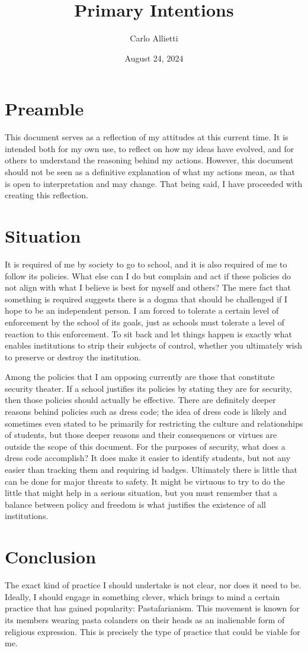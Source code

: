 \documentclass{article}
\title{Primary Intentions}
\author{Carlo Allietti}
\date{August 24, 2024}
\begin{document}
\maketitle
\section{Preamble}
This document serves as a reflection of my attitudes at this current time. It is intended both for my own use, to reflect on how my ideas have evolved, and for others to understand the reasoning behind my actions. However, this document should not be seen as a definitive explanation of what my actions mean, as that is open to interpretation and may change. That being said, I have proceeded with creating this reflection.

\section{Situation}
It is required of me by society to go to school, and it is also required of me to follow its policies. What else can I do but complain and act if these policies do not align with what I believe is best for myself and others? The mere fact that something is required suggests there is a dogma that should be challenged if I hope to be an independent person. I am forced to tolerate a certain level of enforcement by the school of its goals, just as schools must tolerate a level of reaction to this enforcement. To sit back and let things happen is exactly what enables institutions to strip their subjects of control, whether you ultimately wish to preserve or destroy the institution.

Among the policies that I am opposing currently are those that constitute security theater. If a school justifies its policies by stating they are for security, then those policies should actually be effective. There are definitely deeper reasons behind policies such as dress code; the idea of dress code is likely and sometimes even stated to be primarily for restricting the culture and relationships of students, but those deeper reasons and their consequences or virtues are outside the scope of this document. For the purposes of security, what does a dress code accomplish? It does make it easier to identify students, but not any easier than tracking them and requiring id badges. Ultimately there is little that can be done for major threats to safety. It might be virtuous to try to do the little that might help in a serious situation, but you must remember that a balance between policy and freedom is what justifies the existence of all institutions.
\section{Conclusion}
The exact kind of practice I should undertake is not clear, nor does it need to be. Ideally, I should engage in something clever, which brings to mind a certain practice that has gained popularity: Pastafarianism. This movement is known for its members wearing pasta colanders on their heads as an inalienable form of religious expression. This is precisely the type of practice that could be viable for me.
\end{document}
